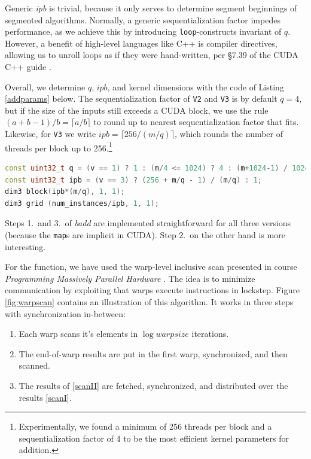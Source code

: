 Generic \textit{ipb} is trivial, because it only serves to determine segment
beginnings of segmented algorithms. Normally, a generic sequentialization factor
impedes performance, as we achieve this by introducing \texttt{loop}-constructs
invariant of $q$. However, a benefit of high-level languages like C++ is
compiler directives, allowing us to unroll loops as if they were hand-written,
per §7.39 of the CUDA C++ guide \cite{cudaguide}.

Overall, we determine $q$, $\mathit{ipb}$, and kernel dimensions with the code
of Listing \ref{addparams} below. The sequentialization factor of \texttt{V2}
and \texttt{V3} is by default $q=4$, but if the size of the inputs still exceeds
a CUDA block, we use the rule $(a + b - 1) / b = \lceil a / b \rceil$ to round up to
nearest sequentialization factor that fits. Likewise, for \texttt{V3} we write
$\mathit{ipb} = \lceil 256 / (m/q) \rceil$, which rounds the number of threads per block
up to 256.\footnote{Experimentally, we found a minimum of 256 threads per block
  and a sequentialization factor of 4 to be the most efficient kernel parameters
  for addition.}


\begin{lstlisting}[language=CPP,caption={\footnotesize CUDA addition parameters and kernel dimensions for version $v$ with size $m$ and $\mathit{num\_instances}$.},label={addparams}]
const uint32_t q = (v == 1) ? 1 : (m/4 <= 1024) ? 4 : (m+1024-1) / 1024;
const uint32_t ipb = (v == 3) ? (256 + m/q - 1) / (m/q) : 1;
dim3 block(ipb*(m/q), 1, 1);
dim3 grid (num_instances/ipb, 1, 1);
\end{lstlisting}

Steps 1.\ and 3.\ of \textit{badd} are implemented straightforward for all three
versions (because the \texttt{map}s are implicit in CUDA). Step 2.\ on the other
hand is more interesting.

For the  function, we have used the warp-level inclusive scan
presented in course \textit{Programming Massively Parallel Hardware}
\cite{PMPH}. The idea is to minimize communication by exploiting that warps
execute instructions in lockstep. Figure \ref{fig:warpscan} contains an
illustration of this algorithm. It works in three steps with synchronization
in-between:
\begin{enumerate}[label=\Roman*]
\item Each warp scans it's elements in $\log \mathit{warpsize}$ iterations.\label{scanI}
\item The end-of-warp results are put in the first warp, synchronized, and then
  scanned.\label{scanII}
\item The results of \ref{scanII} are fetched, synchronized, and distributed over the
  results \ref{scanI}.
\end{enumerate}

